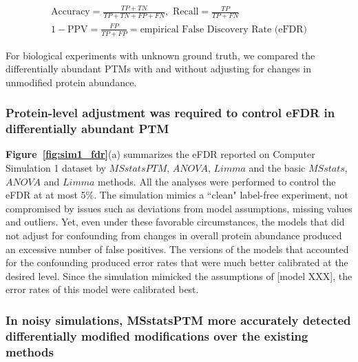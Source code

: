 \documentclass[mcp]{article}
\numberwithin{table}{section}
\def\todo#1{{\color{red}[#1]}}
\def\figref#1{{\bf Figure~\ref{fig:#1}}}
\begin{document}
\begin{equation}\label{eq:summary_stats}
\begin{alignedat}{2}
&\text{Accuracy} = \frac{TP + TN}{TP+TN+FP+FN}, \text{ Recall} = \frac{TP}{TP+FN} & \\
&1 - \text{PPV} = \frac{FP}{TP+FP} = \text{empirical False Discovery Rate (eFDR)}
\end{alignedat}
\end{equation}

For biological experiments with unknown ground truth, we compared the differentially abundant PTMs with and without adjusting for changes in unmodified protein abundance. 

\subsubsection*{Protein-level adjustment was required to control eFDR in differentially abundant PTM}

\figref{sim1_fdr}(a) summarizes the eFDR reported on Computer Simulation 1 dataset by $MSstatsPTM$, $ANOVA$, $Limma$ and the basic $MSstats$, $ANOVA$ and $Limma$ methods. All the analyses were performed to control the eFDR at at most 5\%.  The  simulation mimics a ``clean" label-free experiment, not compromised by issues such as deviations from model assumptions, missing values and outliers. Yet, even under these favorable circumstances, the models that did not adjust for confounding from changes in overall protein abundance produced an excessive number of false positives. The versions of the models that accounted for the confounding produced error rates that were much better calibrated at the desired level. Since the simulation mimicked the assumptions of \todo{model XXX}, the error rates of this model were calibrated best.



\subsubsection*{In noisy simulations, MSstatsPTM more accurately detected differentially modified modifications over the existing methods}
\end{document}
